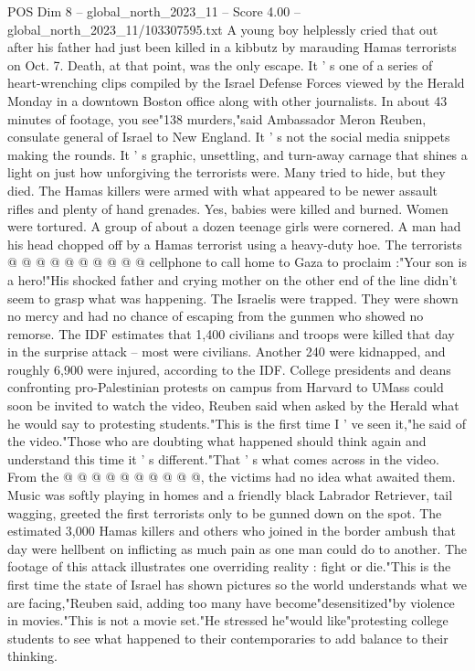 \begin{textsample}{POS Dim 8 – global\_north\_2023\_11 – Score 4.00 – global\_north\_2023\_11/103307595.txt}  \label{ex:f8_pos_186}
A young boy helplessly cried that out after his father had just been killed in a kibbutz by marauding Hamas terrorists on Oct. 7.
Death, at that point, was the only escape.
It ' s one of a series of heart-wrenching clips compiled by the Israel Defense Forces viewed by the Herald Monday in a downtown Boston office along with other journalists.
In about 43 minutes of footage, you see"138 murders,"said Ambassador Meron Reuben, consulate general of Israel to New England.
It ' s not the social media snippets making the rounds.
It ' s graphic, unsettling, and turn-away carnage that shines a light on just how unforgiving the terrorists were.
Many tried to hide, but they died.
The Hamas killers were armed with what appeared to be newer assault rifles and plenty of hand grenades.
Yes, babies were killed and burned.
Women were tortured.
A group of about a dozen teenage girls were cornered.
A man had his head chopped off by a Hamas terrorist using a heavy-duty hoe.
The terrorists @ @ @ @ @ @ @ @ @ @ cellphone to call home to Gaza to proclaim :"Your son is a hero!"His shocked father and crying mother on the other end of the line didn't seem to grasp what was happening.
The Israelis were trapped.
They were shown no mercy and had no chance of escaping from the gunmen who showed no remorse.
The IDF estimates that 1,400 civilians and troops were killed that day in the surprise attack -- most were civilians.
Another 240 were kidnapped, and roughly 6,900 were injured, according to the IDF.
College presidents and deans confronting pro-Palestinian protests on campus from Harvard to UMass could soon be invited to watch the video, Reuben said when asked by the Herald what he would say to protesting students."This is the first time I ' ve seen it,"he said of the video."Those who are doubting what happened should think again and understand this time it ' s different."That ' s what comes across in the video.
From the @ @ @ @ @ @ @ @ @ @, the victims had no idea what awaited them.
Music was softly playing in homes and a friendly black Labrador Retriever, tail wagging, greeted the first terrorists only to be gunned down on the spot.
The estimated 3,000 Hamas killers and others who joined in the border ambush that day were hellbent on inflicting as much pain as one man could do to another.
The footage of this attack illustrates one overriding reality : fight or die."This is the first time the state of Israel has shown pictures so the world understands what we are facing,"Reuben said, adding too many have become"desensitized"by violence in movies."This is not a movie set."He stressed he"would like"protesting college students to see what happened to their contemporaries to add balance to their thinking.

\end{textsample}
